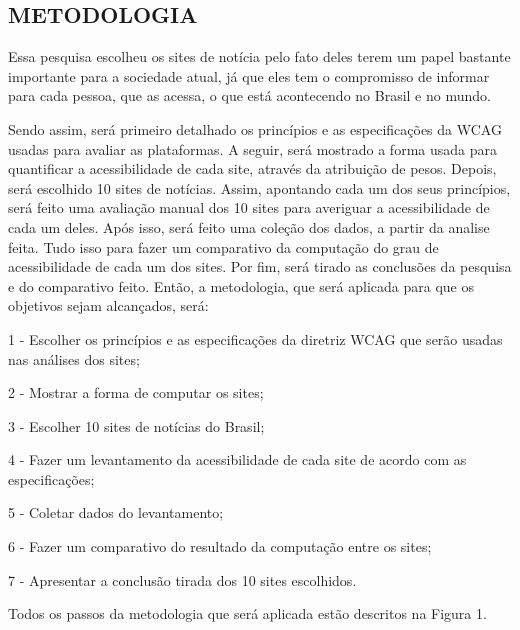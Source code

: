 \documentclass[a4paper]{article}
\begin{document}
\begin{titlepage}
\section{METODOLOGIA}
Essa pesquisa escolheu os sites de notícia pelo fato deles terem um papel bastante importante para a sociedade atual, já que eles tem o compromisso de informar para cada pessoa, que as acessa, o que está acontecendo no Brasil e no mundo.

Sendo assim, será primeiro detalhado os princípios e as especificações da WCAG usadas para avaliar as plataformas.
A seguir, será mostrado a forma usada para quantificar a acessibilidade de cada site, através da atribuição de pesos.
Depois, será escolhido 10 sites de notícias.
Assim, apontando cada um dos seus princípios, será feito uma avaliação manual dos 10 sites para averiguar a acessibilidade de cada um deles.
Após isso, será feito uma coleção dos dados, a partir da analise feita.
Tudo isso para fazer um comparativo da computação do grau de acessibilidade de cada um dos sites.
Por fim, será tirado as conclusões da pesquisa e do comparativo feito.
Então, a metodologia, que será aplicada para que os objetivos sejam alcançados, será:

1 - Escolher os princípios e as especificações da diretriz WCAG que serão usadas nas análises dos sites;

2 - Mostrar a forma de computar os sites;

3 - Escolher 10 sites de notícias do Brasil;

4 - Fazer um levantamento da acessibilidade de cada site de acordo com as especificações;

5 - Coletar dados do levantamento;

6 - Fazer um comparativo do resultado da computação entre os sites;

7 - Apresentar a conclusão tirada dos 10 sites escolhidos.

Todos os passos da metodologia que será aplicada estão descritos na Figura 1.


\end{titlepage}
\end{document}
